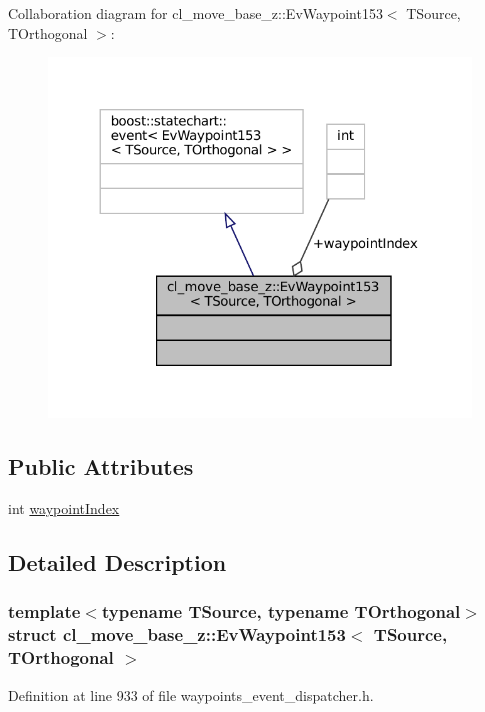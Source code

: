 Collaboration diagram for cl\+\_\+move\+\_\+base\+\_\+z\+:\+:Ev\+Waypoint153$<$ T\+Source, T\+Orthogonal $>$\+:
\nopagebreak
\begin{figure}[H]
\begin{center}
\leavevmode
\includegraphics[width=324pt]{structcl__move__base__z_1_1EvWaypoint153__coll__graph}
\end{center}
\end{figure}
\subsection*{Public Attributes}
\begin{DoxyCompactItemize}
\item 
int \hyperlink{structcl__move__base__z_1_1EvWaypoint153_a95d99ff639ddc67d453ae4caddf5d175}{waypoint\+Index}
\end{DoxyCompactItemize}


\subsection{Detailed Description}
\subsubsection*{template$<$typename T\+Source, typename T\+Orthogonal$>$\newline
struct cl\+\_\+move\+\_\+base\+\_\+z\+::\+Ev\+Waypoint153$<$ T\+Source, T\+Orthogonal $>$}



Definition at line 933 of file waypoints\+\_\+event\+\_\+dispatcher.\+h.



